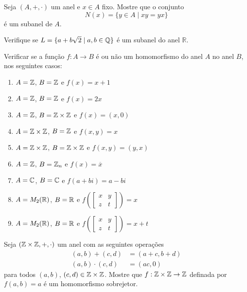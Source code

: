 \documentclass[12pt]{exam}
\begin{document}
\questao{} Seja $(A, + , \cdot)$ um anel e $x \in A$ fixo. Mostre que o conjunto
\[
	N(x) = \{y \in A \mid xy = yx\}
\]
\'e um subanel de $A$.

\vspace{.3cm}

\questao{} Verifique se $L = \{ a + b\sqrt{2} \mid a, b \in \mathbb{Q}\}$ {\'e} um subanel
do anel $\mathbb{R}$.

\vspace{.3cm}

 Verificar se a fun\c{c}\~ao $f : A \to B$ \'e ou n\~ao um homomorfismo do anel $A$ no anel $B$, nos seguintes casos:
\begin{enumerate}[label=({\alph*})]
\item $A = \mathbb{Z}$, $B = \mathbb{Z}$ e $f(x) = x + 1$
\item $A = \mathbb{Z}$, $B = \mathbb{Z}$ e $f(x) = 2x$
\item $A = \mathbb{Z}$, $B = \mathbb{Z} \times \mathbb{Z}$ e $f(x) = (x, 0)$
\item $A = \mathbb{Z} \times \mathbb{Z}$, $B = \mathbb{Z}$ e $f(x,y) = x$
\item $A = \mathbb{Z} \times \mathbb{Z}$, $B = \mathbb{Z} \times \mathbb{Z}$ e $f(x,y) = (y,x)$
\item $A = \mathbb{Z}$, $B = \mathbb{Z}_n$ e $f(x) = \overline{x}$
\item $A = \mathbb{C}$, $B = \mathbb{C}$ e $f(a + bi) = a - bi$
\item $A = M_2(\mathbb{R})$, $B = \mathbb{R}$ e $f\left(\begin{bmatrix}
	x & y\\z & t
\end{bmatrix}\right) = x$
\item $A = M_2(\mathbb{R})$, $B = \mathbb{R}$ e $f\left(\begin{bmatrix}
	x & y\\z & t
\end{bmatrix}\right) = x + t$
\end{enumerate}

\vspace{.3cm}

\questao{} Seja $(\mathbb{Z}\times\mathbb{Z}, +, \cdot)$ um anel com as seguintes operações
\begin{align*}
	(a, b) + (c, d) &= (a + c, b + d)\\
	(a, b)\cdot (c, d) &= (ac, 0)
\end{align*}
para todos $(a, b)$, $(c, d) \in \mathbb{Z}\times\mathbb{Z}$.
Mostre que $ f : \mathbb{Z}\times\mathbb{Z} \to \mathbb{Z}$ definada por $f(a, b) = a$ é um homomorfismo sobrejetor.

\vspace{.3cm}
\end{document}
